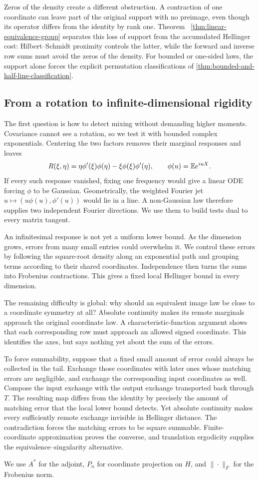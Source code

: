 Zeros of the density create a different obstruction. A contraction of one
coordinate can leave part of the original support with no preimage, even
though its operator differs from the identity by rank one. Theorem~
\ref{thm:linear-equivalence-group} separates this loss of support from the
accumulated Hellinger cost: Hilbert--Schmidt proximity controls the latter,
while the forward and inverse row sums must avoid the zeros of the density.
For bounded or one-sided laws, the support alone forces the explicit
permutation classifications of \cref{thm:bounded-and-half-line-classification}.

\subsection{From a rotation to infinite-dimensional rigidity}

The first question is how to detect mixing without demanding higher
moments. Covariance cannot see a rotation, so we test it with bounded
complex exponentials. Centering the two factors removes their marginal
responses and leaves
\[
 R(\xi,\eta)=\eta\phi'(\xi)\phi(\eta)
              -\xi\phi(\xi)\phi'(\eta),
 \qquad \phi(u)=\mathbb E e^{iuX}.
\]
If every such response vanished, fixing one frequency would give a linear
ODE forcing \(\phi\) to be Gaussian. Geometrically, the weighted Fourier jet
\(u\mapsto(u\phi(u),\phi'(u))\) would lie in a line. A non-Gaussian law
therefore supplies two independent Fourier directions. We use them to build
tests dual to every matrix tangent.

An infinitesimal response is not yet a uniform lower bound. As the dimension
grows, errors from many small entries could overwhelm it. We control these
errors by following the square-root density along an exponential path and
grouping terms according to their shared coordinates. Independence then
turns the sums into Frobenius contractions. This gives a fixed local
Hellinger bound in every dimension.

The remaining difficulty is global: why should an equivalent image law be
close to a coordinate symmetry at all? Absolute continuity makes its remote
marginals approach the original coordinate law. A characteristic-function
argument shows that each corresponding row must approach an allowed signed
coordinate. This identifies the axes, but says nothing yet about the sum of
the errors.

To force summability, suppose that a fixed small amount of error could
always be collected in the tail. Exchange those coordinates with later ones
whose matching errors are negligible, and exchange the corresponding input
coordinates as well. Compose the input exchange with the output exchange
transported back through \(T\). The resulting map differs from the identity
by precisely the amount of matching error that the local lower bound detects.
Yet absolute continuity makes every sufficiently
remote exchange invisible in Hellinger distance. The contradiction forces
the matching errors to be square summable. Finite-coordinate approximation
proves the converse, and translation ergodicity supplies the
equivalence--singularity alternative.

We use \(A^*\) for the adjoint, \(P_n\) for coordinate projection on \(H\),
and \(\|\cdot\|_F\) for the Frobenius norm.
